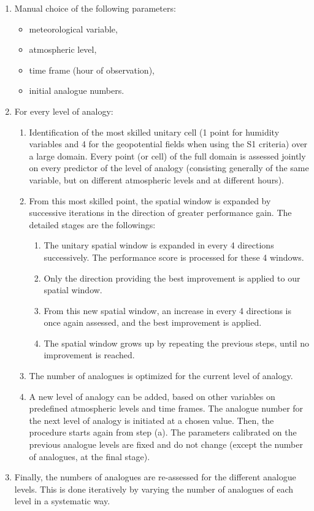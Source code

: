 \documentclass[twocol]{ametsoc}
\begin{document}
\begin{enumerate}
	\item Manual choice of the following parameters:
	\begin{itemize}
		\item meteorological variable,
		\item atmospheric level,
		\item time frame (hour of observation),
		\item initial analogue numbers.
	\end{itemize}
	
	\item For every level of analogy:
	\begin{enumerate}
		\item Identification of the most skilled unitary cell (1 point for humidity variables and 4 for the geopotential fields when using the S1 criteria) over a large domain. Every point (or cell) of the full domain is assessed jointly on every predictor of the level of analogy (consisting generally of the same variable, but on different atmospheric levels and at different hours).
		\item From this most skilled point, the spatial window is expanded by successive iterations in the direction of greater performance gain. The detailed stages are the followings:
		\begin{enumerate}
			\item The unitary spatial window is expanded in every 4 directions successively. The performance score is processed for these 4 windows.
			\item Only the direction providing the best improvement is applied to our spatial window.
			\item From this new spatial window, an increase in every 4 directions is once again assessed, and the best improvement is applied.
			\item The spatial window grows up by repeating the previous steps, until no improvement is reached.
		\end{enumerate}
		\item The number of analogues is optimized for the current level of analogy.
		\item A new level of analogy can be added, based on other variables on predefined atmospheric levels and time frames. The analogue number for the next level of analogy is initiated at a chosen value. Then, the procedure starts again from step (a). The parameters calibrated on the previous analogue levels are fixed and do not change (except the number of analogues, at the final stage). 
	\end{enumerate}
	\item Finally, the numbers of analogues are re-assessed for the different analogue levels. This is done iteratively by varying the number of analogues of each level in a systematic way.
\end{enumerate}
\end{document}
